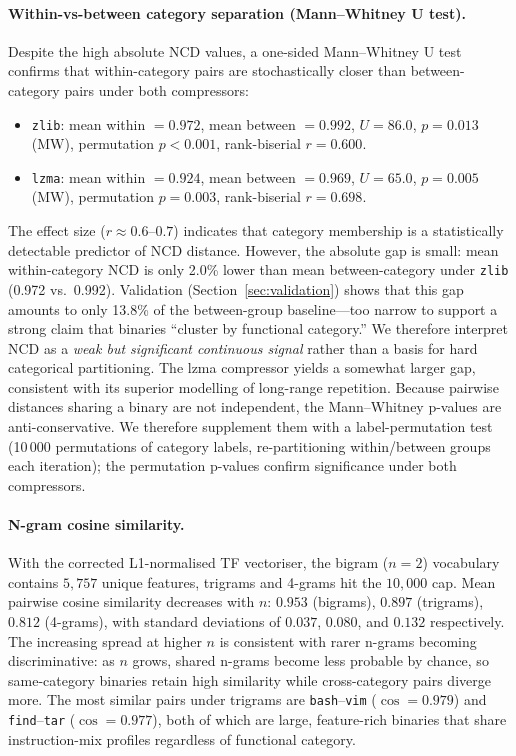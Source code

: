 \documentclass[10pt,twocolumn]{article}
\newcommand{\zlib}{\texttt{zlib}}
\newcommand{\lzma}{\texttt{lzma}}
\begin{document}
\paragraph{Within-vs-between category separation (Mann--Whitney U test).}
Despite the high absolute NCD values, a one-sided Mann--Whitney U test
confirms that within-category pairs are stochastically closer than
between-category pairs under both compressors:
\begin{itemize}
  \item \zlib{}: mean within $= 0.972$, mean between $= 0.992$,
        $U = 86.0$, $p = 0.013$ (MW), permutation $p < 0.001$, rank-biserial $r = 0.600$.
  \item \lzma{}: mean within $= 0.924$, mean between $= 0.969$,
        $U = 65.0$, $p = 0.005$ (MW), permutation $p = 0.003$, rank-biserial $r = 0.698$.
\end{itemize}
The effect size ($r \approx 0.6$--$0.7$) indicates that category membership
is a statistically detectable predictor of NCD distance.  However, the
absolute gap is small: mean within-category NCD is only 2.0\% lower than
mean between-category under \zlib{} (0.972 vs.\ 0.992).  Validation
(Section~\ref{sec:validation}) shows that this gap amounts to only 13.8\%
of the between-group baseline---too narrow to support a strong claim that
binaries ``cluster by functional category.''  We therefore interpret NCD as
a \emph{weak but significant continuous signal} rather than a basis for hard
categorical partitioning.  The lzma compressor yields a somewhat larger
gap, consistent with its superior modelling of long-range repetition.
Because pairwise distances sharing a binary are not independent, the
Mann--Whitney p-values are anti-conservative.  We therefore supplement them
with a label-permutation test (10\,000 permutations of category labels,
re-partitioning within/between groups each iteration); the permutation
p-values confirm significance under both compressors.

\paragraph{N-gram cosine similarity.}
With the corrected L1-normalised TF vectoriser, the bigram ($n=2$) vocabulary
contains $5{,}757$ unique features, trigrams and 4-grams hit the $10{,}000$
cap.  Mean pairwise cosine similarity decreases with $n$: $0.953$ (bigrams),
$0.897$ (trigrams), $0.812$ (4-grams), with standard deviations of $0.037$,
$0.080$, and $0.132$ respectively.  The increasing spread at higher $n$ is
consistent with rarer n-grams becoming discriminative: as $n$ grows, shared
n-grams become less probable by chance, so same-category binaries retain high
similarity while cross-category pairs diverge more.  The most similar pairs
under trigrams are \texttt{bash}--\texttt{vim} ($\cos = 0.979$) and
\texttt{find}--\texttt{tar} ($\cos = 0.977$), both of which are large,
feature-rich binaries that share instruction-mix profiles regardless of
functional category.
\end{document}
